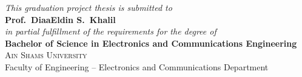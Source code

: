   \vspace{0.3cm}

  \begin{center}
    \begin{tcolorbox}[
      enhanced,
      colback=AcademicBlue!3,
      colframe=WarmGold,
      arc=3pt,
      boxrule=0.8pt,
      width=12.5cm,
      halign=center,
      shadow={1mm}{-1mm}{0mm}{black!15},
      top=2mm, bottom=2mm
    ]
      {\small\itshape\color{TextCharcoal} This graduation project thesis is submitted to} \\[0.15cm]
      {\large\bfseries\sffamily\color{AcademicBlue} Prof.\ DiaaEldin S.\ Khalil} \\[0.15cm]
      {\small\itshape\color{TextCharcoal} in partial fulfillment of the requirements for the degree of} \\[0.1cm]
      {\normalsize\bfseries\sffamily\color{AcademicBlue} Bachelor of Science in Electronics and Communications Engineering} \\[0.2cm]
      \ornamentalrule
      {\large\scshape\color{WarmGold} Ain Shams University}\\[0.05cm]
      {\footnotesize\sffamily\color{SlateGray} Faculty of Engineering -- Electronics and Communications Department}
    \end{tcolorbox}
  \end{center}


